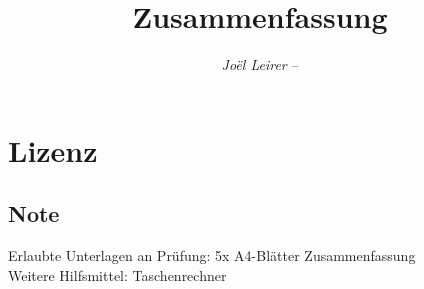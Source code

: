 \documentclass[margin=normal]{tex/hsrzf}
\author{\textsl{Joël Leirer} -- \texttt{\theauthoremail}}
\title{\texttt{\themodule} Zusammenfassung}
\date{\thesemester}
\begin{document}

\maketitle



\section*{Lizenz}
\doclicenseThis

\subsection*{Note}
Erlaubte Unterlagen an Prüfung: 5x A4-Blätter Zusammenfassung \\
Weitere Hilfsmittel: Taschenrechner

\clearpage
\tableofcontents

\clearpage
\setcounter{page}{1}
\end{document}
